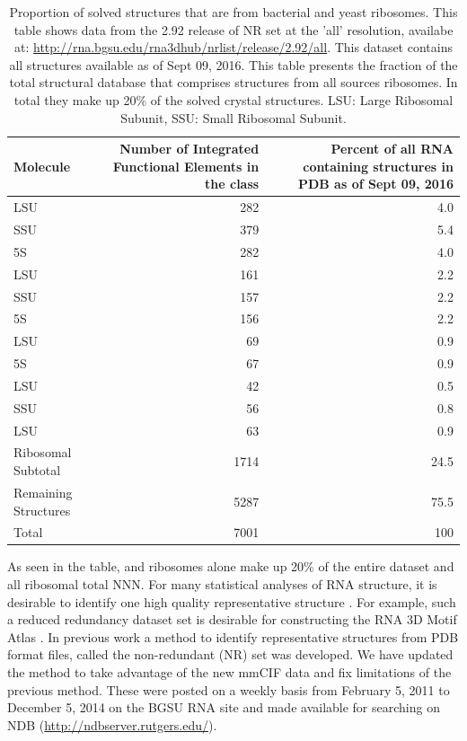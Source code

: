 \begin{table}
  \begin{tabulary}{\linewidth}{LRR}
    \toprule
    Molecule &
      Number of Integrated Functional Elements in the class &
      Percent of all RNA containing structures in PDB as of Sept 09, 2016 \\
    \midrule
    \TT{} LSU            & 282  & 4.0  \\
    \TT{} SSU            & 379  & 5.4  \\
    \TT{} 5S             & 282  & 4.0  \\
    \EC{} LSU            & 161  & 2.2  \\
    \EC{} SSU            & 157  & 2.2  \\
    \EC{} 5S             & 156  & 2.2  \\
    \HM{} LSU            & 69   & 0.9  \\
    \HM{} 5S             & 67   & 0.9  \\
    \DR{} LSU            & 42   & 0.5  \\
    \SC{} SSU            & 56   & 0.8  \\
    \SC{} LSU            & 63   & 0.9  \\
    Ribosomal Subtotal   & 1714 & 24.5 \\
    Remaining Structures & 5287 & 75.5 \\
    Total                & 7001 & 100  \\
    \bottomrule
  \end{tabulary}
  \caption{Proportion of solved structures that are from bacterial and yeast
    ribosomes. This table shows data from the 2.92 release of NR set at the
    'all' resolution, availabe at:
    \url{http://rna.bgsu.edu/rna3dhub/nrlist/release/2.92/all}. This dataset contains
    all structures available as of Sept 09, 2016. This table presents the
    fraction of the total structural database that comprises structures from all
    sources ribosomes. In total they make up 20\% of the solved crystal
  structures. LSU: Large Ribosomal Subunit, SSU: Small Ribosomal Subunit.}
  \label{tab:mol-dist}
\end{table}

As seen in the table, \EC{} and \TT{} ribosomes alone make up 20\% of
the entire dataset and all ribosomal total NNN. For many statistical analyses of
RNA structure, it is desirable to identify one high quality representative
structure \cite{Leontis2012b}. For example, such a reduced redundancy dataset
set is desirable for constructing the RNA 3D Motif Atlas \cite{Petrov2013}. In
previous work a method to identify representative structures  from PDB format
files, called the non-redundant (NR) set was developed. We have updated the
method to take advantage of the new mmCIF data and fix limitations of the
previous method. These were posted on a weekly basis from February 5, 2011 to
December 5, 2014 on the BGSU RNA site and made available for searching on NDB
(\url{http://ndbserver.rutgers.edu/}).

